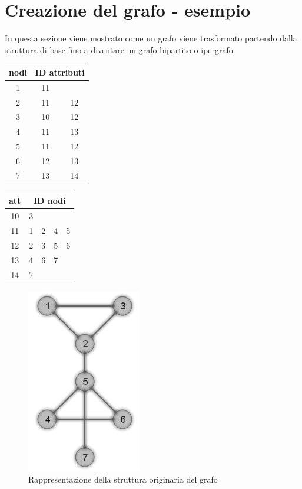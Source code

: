 \section{Creazione del grafo - esempio}
In questa sezione viene mostrato come un grafo viene trasformato partendo dalla struttura di base fino a diventare un grafo bipartito o ipergrafo.\\
%
\begin{multicols}{2}
	\begin{center}
		\begin{tabular}{|c|cc|}
		\hline
		nodi&\multicolumn{2}{c|}{ID attributi}\\
		\hline
		1&11&\\
		2&11&12\\
		3&10&12\\
		4&11&13\\
		5&11&12\\
		6&12&13\\
		7&13&14\\
		\hline
		\end{tabular}
		\label{tab:7_ID_to_att}
		\begin{tabular}{|c|cccc|}
		\hline
		att&\multicolumn{4}{c|}{ID nodi}\\
		\hline
		10&3&&&\\
		11&1&2&4&5\\
		12&2&3&5&6\\
		13&4&6&7&\\
		14&7&&&\\
		\hline
		\end{tabular}
		\label{tab:7_att_to_ID}
	\end{center}
\end{multicols}
%
%
\begin{figure}[htp]
	\centering
	\includegraphics{immagini/7transform_str}
	\caption{Rappresentazione della struttura originaria del grafo}
	\label{fig:7transform_str}
\end{figure}
